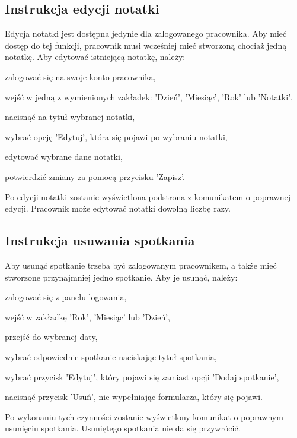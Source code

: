 \documentclass[eng,printmode,openany,oneside]{mgr}
\begin{document}
\subsection*{Instrukcja edycji notatki}

Edycja notatki jest dostępna jedynie dla zalogowanego pracownika. Aby mieć dostęp do tej funkcji, pracownik musi wcześniej mieć stworzoną chociaż jedną notatkę. Aby edytować istniejącą notatkę, należy:

	\begin{enumerate*}
		\item zalogować się na swoje konto pracownika,
		\item wejść w jedną z wymienionych zakładek: 'Dzień', 'Miesiąc', 'Rok' lub 'Notatki',
		\item nacisnąć na tytuł wybranej notatki,
		\item wybrać opcję 'Edytuj', która się pojawi po wybraniu notatki,
		\item edytować wybrane dane notatki,
		\item potwierdzić zmiany za pomocą przycisku 'Zapisz'.
	\end{enumerate*}
	
Po edycji notatki zostanie wyświetlona podstrona z komunikatem o poprawnej edycji. Pracownik może edytować notatki dowolną liczbę razy.
	
\subsection*{Instrukcja usuwania spotkania}

Aby usunąć spotkanie trzeba być zalogowanym pracownikem, a także mieć stworzone przynajmniej jedno spotkanie. Aby je usunąć, należy:

	\begin{enumerate*}
		\item zalogować się z panelu logowania,
		\item wejść w zakładkę 'Rok', 'Miesiąc' lub 'Dzień',
		\item przejść do wybranej daty,
		\item wybrać odpowiednie spotkanie naciskając tytuł spotkania,
		\item wybrać przycisk 'Edytuj', który pojawi się zamiast opcji 'Dodaj spotkanie',
		\item nacisnąć przycisk 'Usuń', nie wypełniając formularza, który się pojawi.
	\end{enumerate*}

Po wykonaniu tych czynności zostanie wyświetlony komunikat o poprawnym usunięciu spotkania. Usuniętego spotkania nie da się przywrócić.
\end{document}
